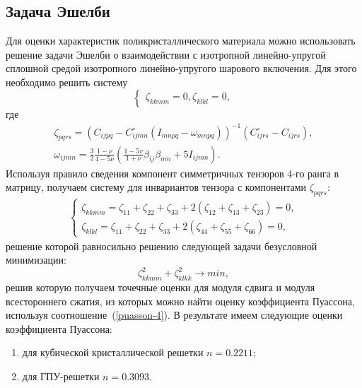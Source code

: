 \documentclass[12pt, a4paper]{article}
\begin{document}
\subsection{Задача Эшелби}
Для оценки характеристик поликристаллического материала можно использовать решение задачи Эшелби о взаимодействии с изотропной линейно-упругой сплошной средой изотропного линейно-упругого шарового включения. Для этого необходимо решить
систему
\[
\begin{cases}
	\zeta_{kkmm} = 0,
	\zeta_{klkl} = 0,
\end{cases}
\]
где
\begin{gather*}
	\zeta_{pqrs} = \left(C_{ijpq} - C_{ijmn}^{\circ} \left(I_{mnpq} - \omega_{mnpq} \right)\right)^{-1} \left(C_{ijrs}^{\circ} - C_{ijrs} \right),\\
	\omega_{ijmn} = \frac{3}{2} \frac{1- \nu}{4- 5\nu} \left(\frac{1 - 5v}{1+\nu}\beta_{ij}\beta_{mn} + 5 I_{ijmn} \right).
\end{gather*}
Используя правило сведения компонент симметричных тензоров 4-го ранга в матрицу, получаем систему для инвариантов тензора с компонентами $\zeta_{pqrs}$:
\begin{gather*}
	\begin{cases}
		\zeta_{kkmm} = \zeta_{11} + \zeta_{22} + \zeta_{33} + 2 (\zeta_{12} + \zeta_{13} + \zeta_{23}) = 0,\\
		\zeta_{klkl} = \zeta_{11} + \zeta_{22} + \zeta_{33} + 2 (\zeta_{44} + \zeta_{55} + \zeta_{66}) = 0,
	\end{cases}
\end{gather*}
решение которой равносильно решению следующей задачи безусловной минимизации:
\[
\zeta^2_{kkmm} + \zeta^2_{klkk} \rightarrow min,
\]
решив которую получаем точечные оценки для модуля сдвига и модуля всестороннего сжатия, из которых можно найти оценку коэффициента Пуассона, используя
соотношение~(\ref{puasson-4}).
В результате имеем следующие оценки коэффициента Пуассона:
\begin{enumerate}
\item для кубической кристаллической решетки $n = 0.2211$;
\item для ГПУ-решетки $n = 0.3093$.
\end{enumerate}
\end{document}
